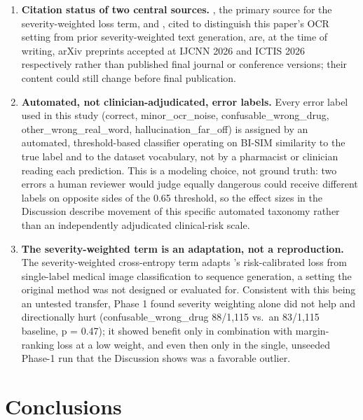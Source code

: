 \documentclass[fleqn,10pt]{wlpeerj}
\begin{document}
\begin{enumerate}
\item
  \textbf{Citation status of two central sources.} \citet{mohammadiseif2026risk}, the primary source for the severity-weighted loss term, and \citet{alansary2026severity}, cited to distinguish this paper's OCR setting from prior severity-weighted text generation, are, at the time of writing, arXiv preprints accepted at IJCNN 2026 and ICTIS 2026 respectively rather than published final journal or conference versions; their content could still change before final publication.
\item
  \textbf{Automated, not clinician-adjudicated, error labels.} Every error label used in this study (correct, minor\_ocr\_noise, confusable\_wrong\_drug, other\_wrong\_real\_word, hallucination\_far\_off) is assigned by an automated, threshold-based classifier operating on BI-SIM similarity to the true label and to the dataset vocabulary, not by a pharmacist or clinician reading each prediction. This is a modeling choice, not ground truth: two errors a human reviewer would judge equally dangerous could receive different labels on opposite sides of the 0.65 threshold, so the effect sizes in the Discussion describe movement of this specific automated taxonomy rather than an independently adjudicated clinical-risk scale.
\item
  \textbf{The severity-weighted term is an adaptation, not a reproduction.} The severity-weighted cross-entropy term adapts \citeauthor{mohammadiseif2026risk}'s \citeyearpar{mohammadiseif2026risk} risk-calibrated loss from single-label medical image classification to sequence generation, a setting the original method was not designed or evaluated for. Consistent with this being an untested transfer, Phase 1 found severity weighting alone did not help and directionally hurt (confusable\_wrong\_drug 88/1,115 vs.\ an 83/1,115 baseline, p = 0.47); it showed benefit only in combination with margin-ranking loss at a low weight, and even then only in the single, unseeded Phase-1 run that the Discussion shows was a favorable outlier.
\end{enumerate}

\section*{Conclusions}\label{sec:conclusion}
\end{document}
